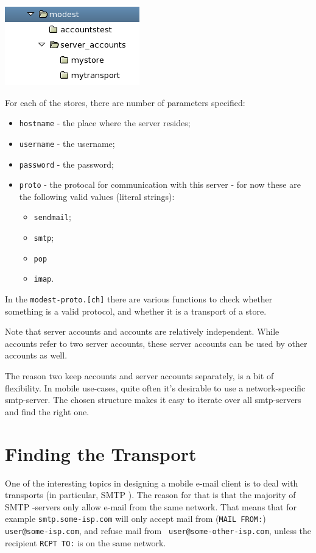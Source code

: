 \documentclass{book}
\newcommand{\smtp}{{\sc SMTP} }
\begin{document}
\includegraphics{modest-account-mgr.png}

For each of the stores, there are number of parameters specified:
\begin{itemize}
\item {\tt hostname} - the place where the server resides;
\item {\tt username} - the username;
\item {\tt password} - the password;
\item {\tt proto} - the protocal for communication with this server - for
  now these are the following valid values (literal strings):
  \begin{itemize}
  \item {\tt sendmail};
  \item {\tt smtp};
  \item {\tt pop}
  \item {\tt imap}.
  \end{itemize}
\end{itemize}

In the {\tt modest-proto.[ch]} there are various functions to check whether
something is a valid protocol, and whether it is a transport of a store. 

Note that server accounts and accounts are relatively independent. While
accounts refer to two server accounts, these server accounts can be
used by other accounts as well.

The reason two keep accounts and server accounts separately, is a bit of
flexibility. In mobile use-cases, quite often it's desirable to use a
network-specific smtp-server. The chosen structure makes it easy to iterate
over all smtp-servers and find the right one.

\chapter{Finding the Transport}
One of the interesting topics in designing a mobile e-mail client is to deal
with transports (in particular, \smtp). The reason for that is that the
majority of \smtp-servers only allow e-mail from the same network. That means
that for example {\tt smtp.some-isp.com} will only accept mail from ({\tt MAIL
  FROM:}) {\tt user@some-isp.com}, and refuse mail from {\tt
  user@some-other-isp.com}, unless the recipient {\tt RCPT TO:} is on the same
network. 
\end{document}
